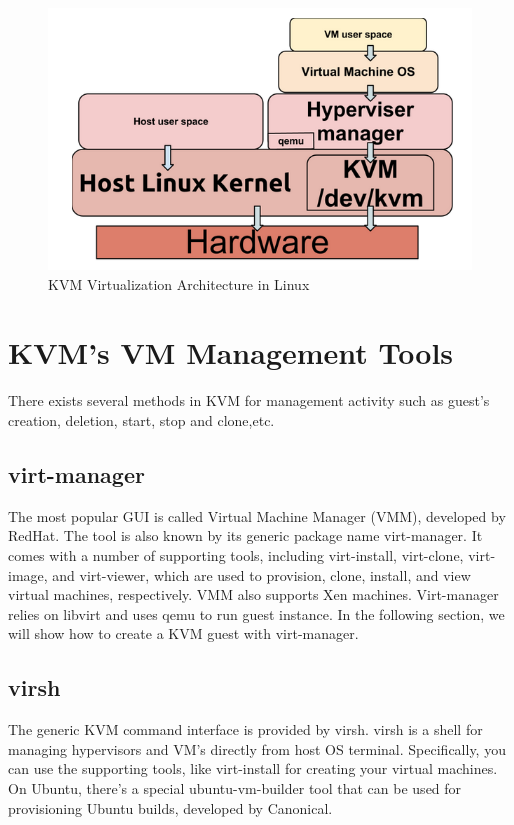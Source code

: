 \begin{figure}[htbp]
	\centering
		\includegraphics[scale = 0.6]{Figures/Figure7.png}
	\caption[KVM Virtualization Architecture in Linux]{KVM Virtualization Architecture in Linux \cite{Reference20}}
	\label{fig:KVM Virtualization Architecture in Linux}
\end{figure}


\section{KVM’s VM Management Tools}

There exists several methods in KVM for management activity such as guest’s creation, deletion, start, stop and clone,etc.

\subsection{virt-manager}
The most popular GUI is called Virtual Machine Manager (VMM), developed by RedHat. 
The tool is also known by its generic package name virt-manager. 
It comes with a number of supporting tools, including virt-install, virt-clone, virt-image, and virt-viewer, 
which are used to provision, clone, install, and view virtual machines, respectively. 
VMM also supports Xen machines. Virt-manager relies on libvirt and uses qemu to run guest instance. 
In the following section, we will show how to create a KVM guest with virt-manager.

\subsection{virsh}
The generic KVM command interface is provided by virsh. virsh is a shell for managing hypervisors and VM’s directly from host OS terminal. 
Specifically, you can use the supporting tools, like virt-install for creating your virtual machines. 
On Ubuntu, there's a special ubuntu-vm-builder tool that can be used for provisioning Ubuntu builds, developed by Canonical.

